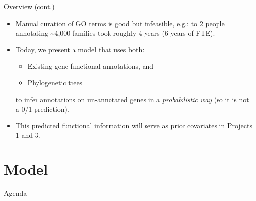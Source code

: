 \documentclass[9pt,ignorenonframetext,aspectratio=169]{beamer}
\begin{document}
\begin{frame}{Overview (cont.)}

\begin{itemize}
\item
  Manual curation of GO terms is good but infeasible, e.g.:  to
  2 people annotating \textasciitilde{}4,000 families took roughly 4
  years (6 years of FTE).\pause
\item
  Today, we present a model that uses both: \pause

  \begin{itemize}
  \item
    Existing gene functional annotations, and
  \item
    Phylogenetic trees
  \end{itemize}

  to infer annotations on un-annotated genes in a \emph{probabilistic
  way} (so it is not a 0/1 prediction). \pause
\item
  This predicted functional information will serve as prior covariates
  in Projects 1 and 3.
\end{itemize}

\end{frame}

\section{Model}\label{model}

\begin{frame}[t]{Agenda}

\tableofcontents[currentsection]

\end{frame}
\end{document}
